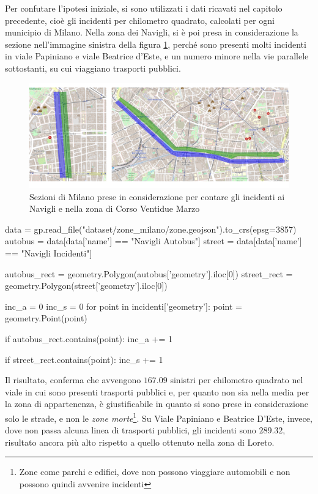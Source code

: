 \documentclass[a4paper,12pt]{report}
\newcommand{\quotestyle}[1]{\textit{#1}}
\begin{document}
Per confutare l'ipotesi iniziale, si sono utilizzati i dati ricavati 
nel capitolo precedente, 
cioè gli incidenti per chilometro quadrato, calcolati per ogni municipio di Milano. 
Nella zona dei Navigli, si è poi presa in considerazione la sezione 
nell'immagine sinistra 
della figura \ref{fig:zona-navigli-22marzo}, 
perché sono presenti molti incidenti in viale Papiniano e viale Beatrice d'Este, 
e un numero minore nella vie parallele sottostanti, su cui viaggiano 
trasporti pubblici. 

\begin{figure}
    \includegraphics[width=\linewidth]{img_unite/zona_navigli_22marzo.png}
    \caption{Sezioni di Milano prese in considerazione per contare gli incidenti ai Navigli e nella zona di Corso Ventidue Marzo}
    \label{fig:zona-navigli-22marzo}
\end{figure}

\begin{code}
data = gp.read_file("dataset/zone_milano/zone.geojson").to_crs(epsg=3857)
autobus = data[data['name'] == "Navigli Autobus"]
street = data[data['name'] == "Navigli Incidenti"]

autobus_rect = geometry.Polygon(autobus['geometry'].iloc[0])
street_rect = geometry.Polygon(street['geometry'].iloc[0])

inc_a = 0
inc_s = 0
for point in incidenti['geometry']: 
    point = geometry.Point(point)

    if autobus_rect.contains(point): 
        inc_a += 1
        
    if street_rect.contains(point): 
        inc_s += 1
\end{code}

Il risultato, conferma che avvengono $167.09$ sinistri per chilometro quadrato
nel viale in cui sono presenti trasporti pubblici e, per quanto non sia nella media per la zona 
di appartenenza, è giustificabile in quanto si sono prese in considerazione solo le strade, 
e non le 
\quotestyle{zone morte}\footnote{Zone come parchi e edifici, dove non possono 
viaggiare automobili e non possono quindi avvenire incidenti}. 
Su Viale Papiniano e Beatrice D'Este, invece, dove non passa alcuna 
linea di trasporti pubblici, 
gli incidenti sono $289.32$, risultato ancora più alto rispetto a quello ottenuto 
nella zona di Loreto. 
\end{document}
